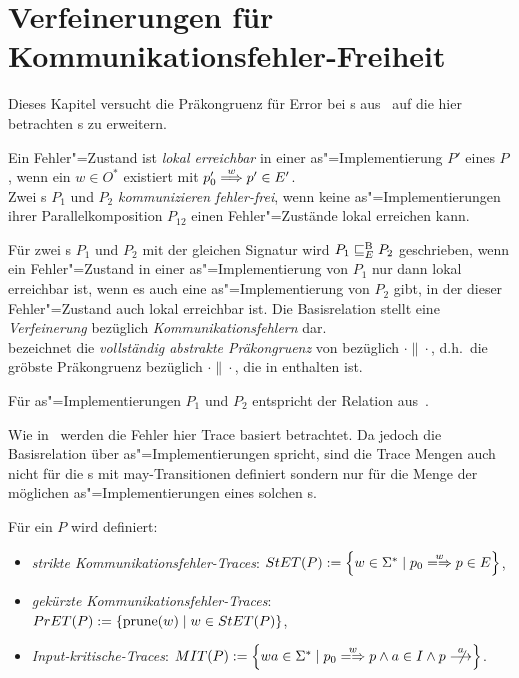 \chapter{Verfeinerungen für Kommunikationsfehler-Freiheit}

Dieses Kapitel versucht die Präkongruenz für Error bei \EIO{}s
aus~\cite{Schinko2016BA} auf die hier betrachten \MEIO{}s zu erweitern.

\begin{Def}
  Ein Fehler"=Zustand ist \emph{lokal erreichbar} in einer
  as"=Implementierung $P'$ eines \MEIO{} $P$, wenn ein $w\in O^*$ existiert mit
  $p'_0 \weakmust[w]p'\in E'$.\\
  Zwei \MEIO{}s $P_1$ und $P_2$ \emph{kommunizieren fehler-frei}, wenn keine
  as"=Implementierungen ihrer Parallelkomposition $P_{12}$ einen
  Fehler"=Zustände lokal erreichen kann.
\end{Def}

\begin{Def}
  Für zwei \MEIO{}s $P_1$ und $P_2$ mit der gleichen Signatur wird $P_1 \sqsubseteq  _E^\mathrm{B}{} P_2$
  geschrieben, wenn ein Fehler"=Zustand in einer as"=Implementierung
  von $P_1$ nur dann lokal erreichbar ist, wenn es auch eine as"=Implementierung
  von $P_2$ gibt, in der dieser Fehler"=Zustand auch lokal
  erreichbar ist. Die Basisrelation stellt eine \emph{Verfeinerung} bezüglich
  \emph{Kommunikationsfehlern} dar.\\
  \ECRel{} bezeichnet die \emph{vollständig abstrakte Präkongruenz} von
  \EBRel{} bezüglich $\cdot\|\cdot$, d.h.\ die gröbste Präkongruenz bezüglich
  $\cdot\|\cdot$, die in \EBRel{} enthalten ist.
\end{Def}

Für as"=Implementierungen $P_1$ und $P_2$ entspricht \EBRel{} der Relation
\EBbaRel{} aus~\cite{Schinko2016BA}.

Wie in~\cite{Schinko2016BA} werden die Fehler hier Trace basiert betrachtet. Da
jedoch die Basisrelation über as"=Implementierungen spricht, sind die Trace Mengen
auch nicht für die \MEIO{}s mit may-Transitionen definiert sondern nur für die
Menge der möglichen as"=Implementierungen eines solchen \MEIO{}s.

\begin{Def}
  Für ein \MEIO{} $P$ wird definiert:
  \begin{itemize}
    \item \emph{strikte Kommunikationsfehler-Traces}: $\StET (P) :=
      \left\{w\in\Sigma ^* \mid p_0 \weakmay[w] p \in E\right\}$,
    \item \emph{gekürzte Kommunikationsfehler-Traces}: $PrET (P) :=
      \left\{\mathrm{prune} (w) \mid w\in StET (P)\right\}$,
    \item \emph{Input-kritische-Traces}: $\MIT (P) := \left\{wa\in\Sigma ^*
      \mid p_0 \weakmay[w] p \land a\in I\land p\nmust[a] \right\}$.
  \end{itemize}
\end{Def}

